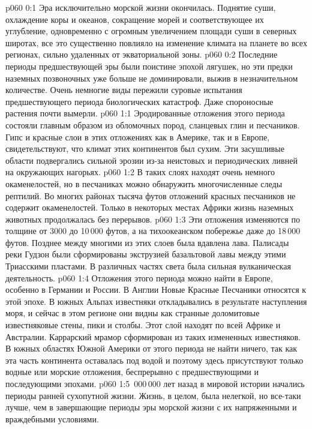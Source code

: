 \author{Носитель Жизни}
\vs p060 0:1 Эра исключительно морской жизни окончилась. Поднятие суши, охлаждение коры и океанов, сокращение морей и соответствующее их углубление, одновременно с огромным увеличением площади суши в северных широтах, все это существенно повлияло на изменение климата на планете во всех регионах, сильно удаленных от экваториальной зоны.
\vs p060 0:2 Последние периоды предшествующей эры были поистине эпохой лягушек, но эти предки наземных позвоночных уже больше не доминировали, выжив в незначительном количестве. Очень немногие виды пережили суровые испытания предшествующего периода биологических катастроф. Даже спороносные растения почти вымерли.
\vs p060 1:1 Эродированные отложения этого периода состояли главным образом из обломочных пород, сланцевых глин и песчаников. Гипс и красные слои в этих отложениях как в Америке, так и в Европе, свидетельствуют, что климат этих континентов был сухим. Эти засушливые области подвергались сильной эрозии из\hyp{}за неистовых и периодических ливней на окружающих нагорьях.
\vs p060 1:2 В таких слоях находят очень немного окаменелостей, но в песчаниках можно обнаружить многочисленные следы рептилий. Во многих районах тысяча футов отложений красных песчаников не содержит окаменелостей. Только в некоторых местах Африки жизнь наземных животных продолжалась без перерывов.
\vs p060 1:3 Эти отложения изменяются по толщине от 3000 до 10\,000 футов, а на тихоокеанском побережье даже до 18\,000 футов. Позднее между многими из этих слоев была вдавлена лава. Палисады реки Гудзон были сформированы экструзией базальтовой лавы между этими Триасскими пластами. В различных частях света была сильная вулканическая деятельность.
\vs p060 1:4 Отложения этого периода можно найти в Европе, особенно в Германии и России. В Англии Новые Красные Песчаники относятся к этой эпохе. В южных Альпах известняки откладывались в результате наступления моря, и сейчас в этом регионе они видны как странные доломитовые известняковые стены, пики и столбы. Этот слой находят по всей Африке и Австралии. Каррарский мрамор сформирован из таких измененных известняков. В южных областях Южной Америки от этого периода не найти ничего, так как эта часть континента оставалась под водой и поэтому здесь присутствуют только водные или морские отложения, беспрерывно с предшествующими и последующими эпохами.
\vs p060 1:5 \,000\,000 лет назад в мировой истории начались периоды ранней сухопутной жизни. Жизнь, в целом, была нелегкой, но все\hyp{}таки лучше, чем в завершающие периоды эры морской жизни с их напряженными и враждебными условиями.
